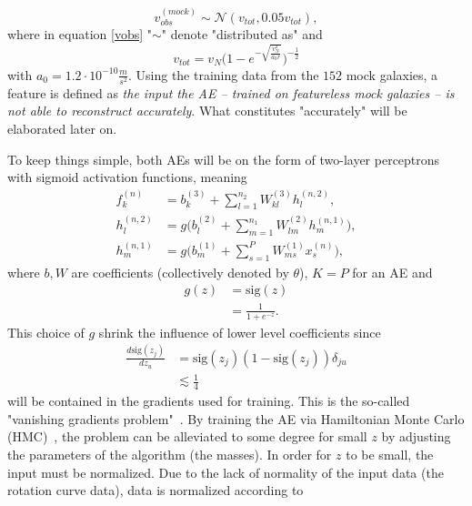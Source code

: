 \begin{example}
\begin{equation}
		v_{obs}^{(mock)} \sim \mathcal{N}(v_{tot},0.05v_{tot}),
		\label{vobs}
	\end{equation}  
	where in equation \eqref{vobs} "$\sim$" denote "distributed as" and
	\begin{equation}
		v_{tot}=v_N \bigg(1-e^{-\sqrt{\frac{v_N^2}{a_0r}}}\bigg)^{-\frac{1}{2}}
		\label{vtot}
	\end{equation}
	with $a_0=1.2\cdot 10^{-10}\frac{m}{s^2}$. Using the training data from the $152$ mock galaxies, a feature is defined as \emph{the input the AE -- trained on featureless mock galaxies -- is not able to reconstruct accurately}. What constitutes "accurately" will be elaborated later on.\newline
	
	To keep things simple, both AEs will be on the form of two-layer perceptrons~\cite{hastie_09,murphy2013machine} with sigmoid activation functions, meaning 
	\begin{equation}
		\begin{split}
			f_k^{(n)}&=b_k^{(3)}+\sum_{l=1}^{n_2}W_{kl}^{(3)}h_{l}^{(n,2)},\\
			h_{l}^{(n,2)}&=g\bigg(b_l^{(2)}+\sum_{m=1}^{n_1}W_{lm}^{(2)}h_{m}^{(n,1)}\bigg),\\
			h_{m}^{(n,1)}&=g\bigg(b_m^{(1)}+\sum_{s=1}^{P}W_{ms}^{(1)}x_{s}^{(n)}\bigg),
		\end{split}
		\label{n2}
	\end{equation}
	where $b,W$ are coefficients (collectively denoted by $\theta$), $K = P$ for an AE and
	\begin{equation}
		\begin{split}
			g(z)&=\text{sig}(z)\\
			&=\frac{1}{1+e^{-z}}.
		\end{split}
	\end{equation}
	This choice of $g$ shrink the influence of lower level coefficients since
	\begin{equation}
		\begin{split}
			\frac{d \text{sig}(z_j)}{d z_u}&=\text{sig}(z_j)(1-\text{sig}(z_j))\delta_{ju}\\
			&\lesssim \frac{1}{4}
		\end{split}
	\end{equation}
	will be contained in the gradients used for training. This is the so-called "vanishing gradients problem"~\cite{Bengio1994,Bengio1995}. By training the AE via Hamiltonian Monte Carlo (HMC)~\cite{Duane:1987de,Neal:1996,Neal2012}, the problem can be alleviated to some degree for small $z$ by adjusting the parameters of the algorithm (the masses). In order for $z$ to be small, the input must be normalized. Due to the lack of normality of the input data (the rotation curve data), data is normalized according to

\end{example}
